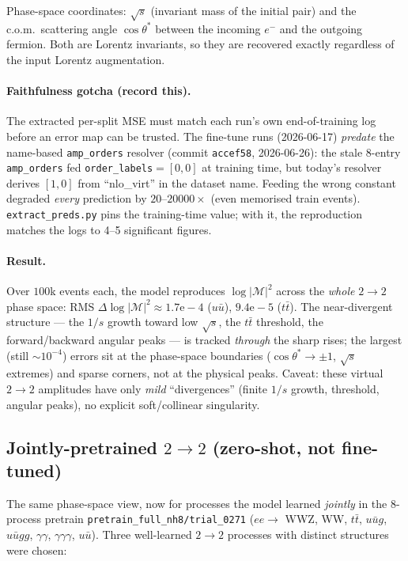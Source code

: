 Phase-space coordinates: $\sqrt{s}$ (invariant mass of the initial pair) and the
c.o.m.\ scattering angle $\cos\theta^*$ between the incoming $e^-$ and the outgoing
fermion.  Both are Lorentz invariants, so they are recovered exactly regardless of the
input Lorentz augmentation.

\paragraph{Faithfulness gotcha (record this).}
The extracted per-split MSE must match each run's own end-of-training log before an
error map can be trusted.  The fine-tune runs (2026-06-17) \emph{predate} the
name-based \texttt{amp\_orders} resolver (commit \texttt{accef58}, 2026-06-26): the
stale 8-entry \texttt{amp\_orders} fed \texttt{order\_labels}$=[0,0]$ at training
time, but today's resolver derives $[1,0]$ from ``nlo\_virt'' in the dataset name.
Feeding the wrong constant degraded \emph{every} prediction by $20$--$20000\times$
(even memorised train events).  \texttt{extract\_preds.py} pins the training-time
value; with it, the reproduction matches the logs to 4--5 significant figures.

\paragraph{Result.}  Over $100$k events each, the model reproduces
$\log|\mathcal{M}|^2$ across the \emph{whole} $2\to2$ phase space: RMS
$\Delta\log|\mathcal{M}|^2 \approx 1.7\mathrm{e}{-}4$ ($u\bar u$),
$9.4\mathrm{e}{-}5$ ($t\bar t$).  The near-divergent structure --- the $1/s$ growth
toward low $\sqrt{s}$, the $t\bar t$ threshold, the forward/backward angular peaks ---
is tracked \emph{through} the sharp rises; the largest (still $\sim\!10^{-4}$) errors
sit at the phase-space boundaries ($\cos\theta^*\to\pm1$, $\sqrt{s}$ extremes) and
sparse corners, not at the physical peaks.  Caveat: these virtual $2\to2$ amplitudes
have only \emph{mild} ``divergences'' (finite $1/s$ growth, threshold, angular peaks),
no explicit soft/collinear singularity.

\subsection{Jointly-pretrained $2\to2$ (zero-shot, not fine-tuned)}

The same phase-space view, now for processes the model learned \emph{jointly} in the
8-process pretrain \texttt{pretrain\_full\_nh8/trial\_0271}
($ee\to$ WWZ, WW, $t\bar t$, $u\bar u g$, $u\bar u gg$, $\gamma\gamma$,
$\gamma\gamma\gamma$, $u\bar u$).  Three well-learned $2\to2$ processes with distinct
structures were chosen:

